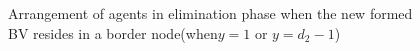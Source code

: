 \begin{itemize}
\begin{figure} [H]
      \hspace{1in} 
  \caption{Arrangement of agents in elimination phase when the new formed BV resides in a border node(when$y=1$ or $y=d_2-1$)} 
  \label{fig:casethree} %
\end{figure}


\end{itemize}
